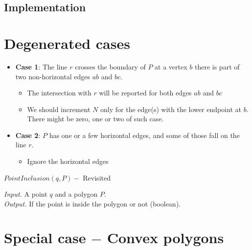 \documentclass[twoside,12pt, a4paper]{memoir}
\begin{document}
\subsection{Implementation}\label{subsec:label}


\section{Degenerated cases}\label{subsec:point-degenerated}

\begin{itemize}
  \item \textbf{Case 1}: The line $r$ crosses the boundary of $P$ at a vertex $b$ there is part of two non-horizontal edges $ab$ and $bc$.
        \begin{itemize}
          \item The intersection with $r$ will be reported for both edges $ab$ and $bc$
          \item We should increment $N$ only for the edge(s) with the lower endpoint at $b$. There might be zero, one or two of such case.
        \end{itemize}

  \item \textbf{Case 2}: $P$ has one or a few horizontal edges, and some of those fall on the line $r$.
        \begin{itemize}
          \item Ignore the horizontal edges
        \end{itemize}
\end{itemize}

\begin{algorithm}
\caption{$PointInclusion(q, P) - $ Revisited}
\textit{Input.} A point $q$ and a polygon $P$. \\
\textit{Output.} If the point is inside the polygon or not (boolean).
\begin{algorithmic}[1]
      \EndIf{}
    \EndFor{}

    \Else{}
    \EndIf{}
\end{algorithmic}\label{inclusion}
\end{algorithm}

\section{Special case $-$ Convex polygons}\label{subsec:point-convex}
\end{document}
